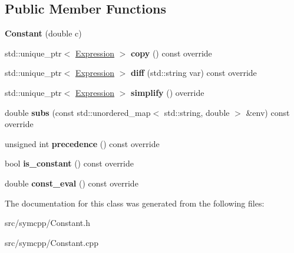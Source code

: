 \subsection*{Public Member Functions}
\begin{DoxyCompactItemize}
\item 
{\bfseries Constant} (double c)\hypertarget{classConstant_a677e1635445fffb33d2bfd8474c79c4d}{}\label{classConstant_a677e1635445fffb33d2bfd8474c79c4d}

\item 
std\+::unique\+\_\+ptr$<$ \hyperlink{classExpression}{Expression} $>$ {\bfseries copy} () const override\hypertarget{classConstant_a28fd90c563d1c707383fe9c0fd78ecbf}{}\label{classConstant_a28fd90c563d1c707383fe9c0fd78ecbf}

\item 
std\+::unique\+\_\+ptr$<$ \hyperlink{classExpression}{Expression} $>$ {\bfseries diff} (std\+::string var) const override\hypertarget{classConstant_a367200d5fc17486c5a8991908e068fa4}{}\label{classConstant_a367200d5fc17486c5a8991908e068fa4}

\item 
std\+::unique\+\_\+ptr$<$ \hyperlink{classExpression}{Expression} $>$ {\bfseries simplify} () override\hypertarget{classConstant_a3ca3df6cc8a9bfc3fa024610441c7c42}{}\label{classConstant_a3ca3df6cc8a9bfc3fa024610441c7c42}

\item 
double {\bfseries subs} (const std\+::unordered\+\_\+map$<$ std\+::string, double $>$ \&env) const override\hypertarget{classConstant_ae4d7343c7488199e8db5ae51888d89e6}{}\label{classConstant_ae4d7343c7488199e8db5ae51888d89e6}

\item 
unsigned int {\bfseries precedence} () const override\hypertarget{classConstant_affe91afa04b906396d6c7158e1444001}{}\label{classConstant_affe91afa04b906396d6c7158e1444001}

\item 
bool {\bfseries is\+\_\+constant} () const override\hypertarget{classConstant_ac4bc5cef39af3ca2e1b6482a575e6d39}{}\label{classConstant_ac4bc5cef39af3ca2e1b6482a575e6d39}

\item 
double {\bfseries const\+\_\+eval} () const override\hypertarget{classConstant_a7342f36e1831b2564961697f2b5785d1}{}\label{classConstant_a7342f36e1831b2564961697f2b5785d1}

\end{DoxyCompactItemize}


The documentation for this class was generated from the following files\+:\begin{DoxyCompactItemize}
\item 
src/symcpp/Constant.\+h\item 
src/symcpp/Constant.\+cpp\end{DoxyCompactItemize}
